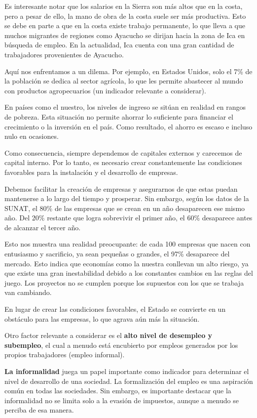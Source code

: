 \documentclass[
  jou,
  floatsintext,
  longtable,
  a4paper,
  nolmodern,
  notxfonts,
  notimes,
  12pt,
  colorlinks=true,linkcolor=blue,citecolor=blue,urlcolor=blue]{apa7}
\begin{document}
Es interesante notar que los salarios en la Sierra son más altos que en
la costa, pero a pesar de ello, la mano de obra de la costa suele ser
más productiva. Esto se debe en parte a que en la costa existe trabajo
permanente, lo que lleva a que muchos migrantes de regiones como
Ayacucho se dirijan hacia la zona de Ica en búsqueda de empleo. En la
actualidad, Ica cuenta con una gran cantidad de trabajadores
provenientes de Ayacucho.

Aquí nos enfrentamos a un dilema. Por ejemplo, en Estados Unidos, solo
el 7\% de la población se dedica al sector agrícola, lo que les permite
abastecer al mundo con productos agropecuarios (un indicador relevante a
considerar).

En países como el nuestro, los niveles de ingreso se sitúan en realidad
en rangos de pobreza. Esta situación no permite ahorrar lo suficiente
para financiar el crecimiento o la inversión en el país. Como resultado,
el ahorro es escaso e incluso nulo en ocasiones.

Como consecuencia, siempre dependemos de capitales externos y carecemos
de capital interno. Por lo tanto, es necesario crear constantemente las
condiciones favorables para la instalación y el desarrollo de empresas.

Debemos facilitar la creación de empresas y asegurarnos de que estas
puedan mantenerse a lo largo del tiempo y prosperar. Sin embargo, según
los datos de la SUNAT, el 80\% de las empresas que se crean en un año
desaparecen ese mismo año. Del 20\% restante que logra sobrevivir el
primer año, el 60\% desaparece antes de alcanzar el tercer año.

Esto nos muestra una realidad preocupante: de cada 100 empresas que
nacen con entusiasmo y sacrificio, ya sean pequeñas o grandes, el 97\%
desaparece del mercado. Esto indica que economías como la nuestra
conllevan un alto riesgo, ya que existe una gran inestabilidad debido a
los constantes cambios en las reglas del juego. Los proyectos no se
cumplen porque los supuestos con los que se trabaja van cambiando.

En lugar de crear las condiciones favorables, el Estado se convierte en
un obstáculo para las empresas, lo que agrava aún más la situación.

Otro factor relevante a considerar es el \textbf{alto nivel de desempleo
y subempleo}, el cual a menudo está encubierto por empleos generados por
los propios trabajadores (empleo informal).

\textbf{La informalidad} juega un papel importante como indicador para
determinar el nivel de desarrollo de una sociedad. La formalización del
empleo es una aspiración común en todas las sociedades. Sin embargo, es
importante destacar que la informalidad no se limita solo a la evasión
de impuestos, aunque a menudo se perciba de esa manera.
\end{document}
